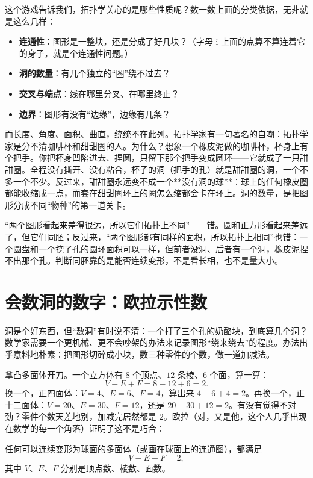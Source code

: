 这个游戏告诉我们，拓扑学关心的是哪些性质呢？数一数上面的分类依据，无非就是这么几样：

\begin{itemize}
  \item \textbf{连通性}：图形是一整块，还是分成了好几块？（字母 i 上面的点算不算连着它的身子，就是个连通性问题。）
  \item \textbf{洞的数量}：有几个独立的“圈”绕不过去？
  \item \textbf{交叉与端点}：线在哪里分叉、在哪里终止？
  \item \textbf{边界}：图形有没有“边缘”，边缘有几条？
\end{itemize}

而长度、角度、面积、曲直，统统不在此列。拓扑学家有一句著名的自嘲：拓扑学家是分不清咖啡杯和甜甜圈的人。为什么？想象一个橡皮泥做的咖啡杯，杯身上有个把手。你把杯身凹陷进去、捏圆，只留下那个把手变成圆环——它就成了一只甜甜圈。全程没有撕开、没有粘合，杯子的洞（把手的孔）就是甜甜圈的洞，一个不多一个不少。反过来，甜甜圈永远变不成一个**没有洞的球**：球上的任何橡皮圈都能收缩成一点，而套在甜甜圈环上的圈怎么缩都会卡在环上。洞的数量，是把图形分成不同“物种”的第一道关卡。

\begin{fanli}
“两个图形看起来差得很远，所以它们拓扑上不同”——错。圆和正方形看起来差远了，但它们同胚；反过来，“两个图形都有同样的面积，所以拓扑上相同”也错：一个圆盘和一个挖了孔的圆环面积可以一样，但前者没洞、后者有一个洞，橡皮泥捏不出那个孔。判断同胚靠的是能否连续变形，不是看长相，也不是量大小。
\end{fanli}

\section{会数洞的数字：欧拉示性数}

洞是个好东西，但“数洞”有时说不清：一个打了三个孔的奶酪块，到底算几个洞？数学家需要一个更机械、更不会吵架的办法来记录图形“绕来绕去”的程度。办法出乎意料地朴素：把图形切碎成小块，数三种零件的个数，做一道加减法。

拿凸多面体开刀。一个立方体有 $8$ 个顶点、$12$ 条棱、$6$ 个面，算一算：
\[
V - E + F = 8 - 12 + 6 = 2.
\]
换一个，正四面体：$V=4$、$E=6$、$F=4$，算出来 $4-6+4=2$。再换一个，正十二面体：$V=20$、$E=30$、$F=12$，还是 $20-30+12=2$。有没有觉得不对劲？零件个数天差地别，加减完居然都是 $2$。欧拉（对，又是他，这个人几乎出现在数学的每一个角落）证明了这不是巧合：

\begin{dingli}[多面体的欧拉公式]
任何可以连续变形为球面的多面体（或画在球面上的连通图），都满足
\[
V - E + F = 2,
\]
其中 $V$、$E$、$F$ 分别是顶点数、棱数、面数。
\end{dingli}


